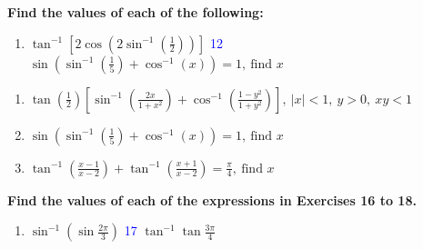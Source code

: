 \documentclass[a4paper,12pt]{article}                                                                       \usepackage{amsmath, amssymb, xcolor, tcolorbox}                                                            \usepackage{geometry}
\begin{document}
\textbf{Find the values of each of the following:}

\begin{enumerate}
    \item[\textcolor{blue}{11}]  $ \tan^{-1}\left[ 2 \cos\left( 2 \sin^{-1}\left( \frac{1}{2} \right) \right) \right] $
    \hspace{1cm}
    \textcolor{blue}{12} $ \sin \left( \sin^{-1}\left( \frac{1}{5} \right) + \cos^{-1}(x) \right) = 1, \ \text{find } x$
\end{enumerate}


\begin{enumerate}
    \item[\textcolor{blue}{13}] $ \tan\left(\frac{1}{2}\right) \left[ \sin^{-1}\left(\frac{2x}{1+x^2}\right) + \cos^{-1}\left(\frac{1-y^2}{1+y^2}\right) \right] , \ |x| < 1, \ y > 0, \ xy < 1$
    \item[\textcolor{blue}{14}] $ \sin \left( \sin^{-1}\left( \frac{1}{5} \right) + \cos^{-1}(x) \right) = 1, \ \text{find } x$
    \item[\textcolor{blue}{15}] $ \tan^{-1} \left( \frac{x-1}{x-2} \right) + \tan^{-1} \left( \frac{x+1}{x-2} \right) = \frac{\pi}{4}, \ \text{find } x$
\end{enumerate}

\textbf{Find the values of each of the expressions in Exercises 16 to 18.}

\begin{enumerate}
    \item[\textcolor{blue}{16}] $\sin^{-1} \left( \sin \frac{2\pi}{3} \right)$
    \hspace{1cm}
    \textcolor{blue}{17} $\tan^{-1} \tan \frac{3\pi}{4}$
\end{enumerate}
\end{document}

